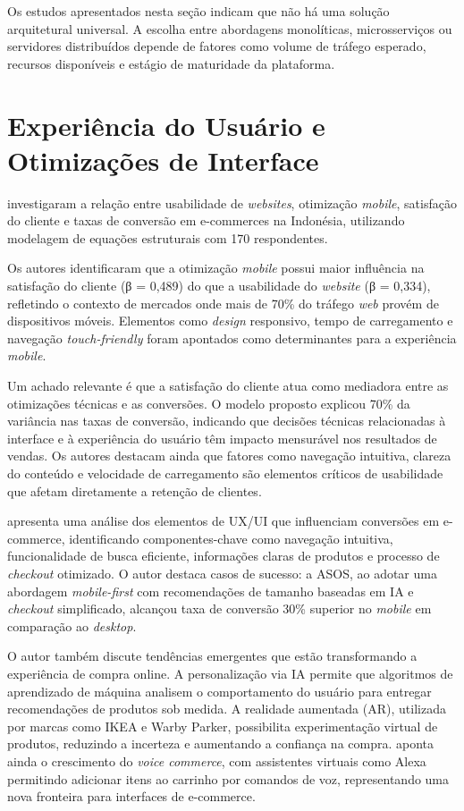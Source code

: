 Os estudos apresentados nesta seção indicam que não há uma solução arquitetural universal. A escolha entre abordagens monolíticas, microsserviços ou servidores distribuídos depende de fatores como volume de tráfego esperado, recursos disponíveis e estágio de maturidade da plataforma.

\section{Experiência do Usuário e Otimizações de Interface}

\cite{nawir_impact_2024} investigaram a relação entre usabilidade de \textit{websites}, otimização \textit{mobile}, satisfação do cliente e taxas de conversão em e-commerces na Indonésia, utilizando modelagem de equações estruturais com 170 respondentes.

Os autores identificaram que a otimização \textit{mobile} possui maior influência na satisfação do cliente (β = 0,489) do que a usabilidade do \textit{website} (β = 0,334), refletindo o contexto de mercados onde mais de 70\% do tráfego \textit{web} provém de dispositivos móveis. Elementos como \textit{design} responsivo, tempo de carregamento e navegação \textit{touch-friendly} foram apontados como determinantes para a experiência \textit{mobile}.

Um achado relevante é que a satisfação do cliente atua como mediadora entre as otimizações técnicas e as conversões. O modelo proposto explicou 70\% da variância nas taxas de conversão, indicando que decisões técnicas relacionadas à interface e à experiência do usuário têm impacto mensurável nos resultados de vendas. Os autores destacam ainda que fatores como navegação intuitiva, clareza do conteúdo e velocidade de carregamento são elementos críticos de usabilidade que afetam diretamente a retenção de clientes.

\cite{jain_role_2025} apresenta uma análise dos elementos de UX/UI que influenciam conversões em e-commerce, identificando componentes-chave como navegação intuitiva, funcionalidade de busca eficiente, informações claras de produtos e processo de \textit{checkout} otimizado. O autor destaca casos de sucesso: a ASOS, ao adotar uma abordagem \textit{mobile-first} com recomendações de tamanho baseadas em IA e \textit{checkout} simplificado, alcançou taxa de conversão 30\% superior no \textit{mobile} em comparação ao \textit{desktop}.

O autor também discute tendências emergentes que estão transformando a experiência de compra online. A personalização via IA permite que algoritmos de aprendizado de máquina analisem o comportamento do usuário para entregar recomendações de produtos sob medida. A realidade aumentada (AR), utilizada por marcas como IKEA e Warby Parker, possibilita experimentação virtual de produtos, reduzindo a incerteza e aumentando a confiança na compra. \cite{jain_role_2025} aponta ainda o crescimento do \textit{voice commerce}, com assistentes virtuais como Alexa permitindo adicionar itens ao carrinho por comandos de voz, representando uma nova fronteira para interfaces de e-commerce.

